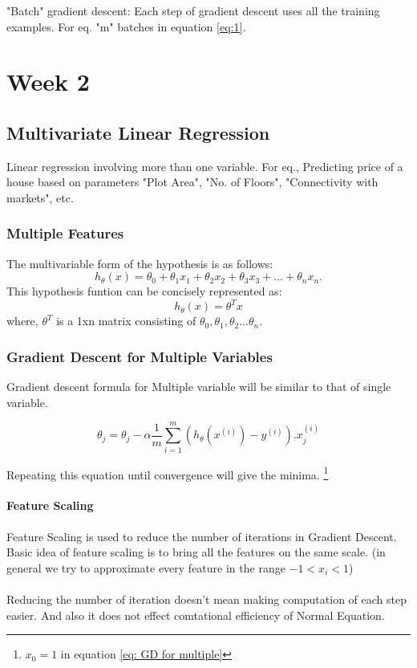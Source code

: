 \documentclass[12pt]{report}
\begin{document}
    "Batch" gradient descent: Each step of gradient descent uses all the training examples.
    For eq. "m" batches in equation \ref{eq:1}.




\chapter{Week 2}

\section{Multivariate Linear Regression}
  Linear regression involving more than one variable. For eq., Predicting price of a house based on parameters "Plot Area", "No. of Floors", "Connectivity with markets", etc.

  \subsection{Multiple Features}
    The multivariable form of the hypothesis is as follows:
    \begin{equation} \label {eq:5}
    	h_\theta(x) = \theta_0 + \theta_1x_1 + \theta_2x_2 + \theta_ 3x_3 + ... + \theta_{n}x_n.	
    \end{equation}
    This hypothesis funtion can be concisely represented as:
    \begin{equation}
    	h_\theta(x) = \theta^{T}x
    \end{equation}
    where, $ \theta^T $ is a 1xn matrix consisting of $ \theta_0, \theta_1, \theta_2 ... \theta_n $.


  \subsection{Gradient Descent for Multiple Variables}
    Gradient descent formula for Multiple variable will be similar to that of single variable.

    \begin{equation} \label {eq: GD for multiple}
    	\theta_j =  \theta_j - \alpha \frac{1}{m} \sum_{i=1}^{m} (h_\theta(x^{(i)})-y^{(i)}).x_j^{(i)}
    \end{equation}

    Repeating this equation until convergence will give the minima. \footnote[1]{$x_0 = 1$ in equation \ref{eq: GD for multiple}}

  \subsubsection{Feature Scaling}
    Feature Scaling is used to reduce the number of iterations in Gradient Descent. Basic idea of feature scaling is to bring all the features on the same scale. (in general we try to approximate every feature in the range $ -1 < x_i < 1 $)
    \\ \\ Reducing the number of iteration doesn't mean making computation of each step easier. And also it does not effect comtational efficiency of Normal Equation.
\end{document}
